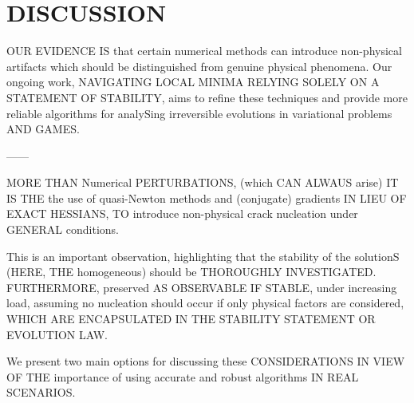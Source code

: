 
\section{DISCUSSION} 

% 

OUR EVIDENCE IS that certain numerical methods can introduce non-physical artifacts which should be distinguished from genuine physical phenomena. Our ongoing work, NAVIGATING LOCAL MINIMA RELYING SOLELY ON A STATEMENT OF STABILITY, aims to refine these techniques and provide more reliable algorithms for analySing irreversible evolutions in variational problems AND GAMES.




------


MORE THAN Numerical PERTURBATIONS, (which CAN ALWAUS arise) IT IS THE the use of quasi-Newton methods and (conjugate) gradients IN LIEU OF EXACT HESSIANS, TO introduce non-physical crack nucleation under GENERAL conditions.

This is an important observation, highlighting that the stability of the solutionS (HERE, THE homogeneous) should be THOROUGHLY INVESTIGATED. FURTHERMORE, preserved AS OBSERVABLE IF STABLE, under increasing load, assuming no nucleation should occur if only physical factors are considered, WHICH ARE ENCAPSULATED IN THE STABILITY STATEMENT OR EVOLUTION LAW.

We present two main options for discussing these CONSIDERATIONS IN VIEW OF THE importance of using accurate and robust algorithms IN REAL SCENARIOS.

